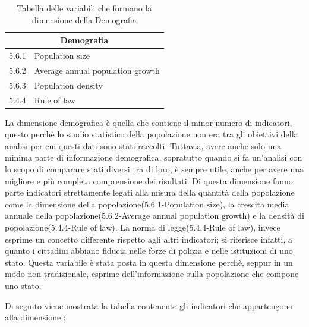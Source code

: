 \documentclass[a4paper,12pt, openright]{report}
\begin{document}
\begin{table}[h!]
    \centering
    \begin{tabular}{ |l|l| }
        \hline
        \multicolumn{2}{|c|}{\textbf{Demografia}} \\
        \hline
        5.6.1 & Population size \\
        \hline
        5.6.2 & Average annual population growth \\
        \hline
        5.6.3 & Population density \\
        \hline
        5.4.4 & Rule of law \\
        \hline
      \end{tabular}
      \caption{Tabella delle variabili che formano la dimensione della Demografia}
    \label{table:1}
\end{table}

La dimensione demografica è quella che contiene il minor numero di indicatori, questo perchè lo studio statistico della popolazione non era tra gli obiettivi 
della analisi per cui questi dati sono stati raccolti. Tuttavia, avere anche solo una minima parte di informazione demografica, sopratutto quando si fa un'analisi 
con lo scopo di comparare stati diversi tra di loro, è sempre utile, anche per avere una migliore e più completa comprensione dei risultati. Di questa dimensione
fanno parte indicatori strettamente legati alla misura della quantità della popolazione come la dimensione della popolazione(5.6.1-Population size), la 
crescita media annuale della popolazione(5.6.2-Average annual population growth) e la densità di popolazione(5.4.4-Rule of law). La norma di 
legge(5.4.4-Rule of law), invece esprime un concetto differente rispetto agli altri indicatori; si riferisce infatti, a quanto i cittadini abbiano fiducia 
nelle forze di polizia e nelle istituzioni di uno stato. Questa variabile è stata posta in questa dimensione perchè, seppur in un modo non tradizionale, esprime
dell'informazione sulla popolazione che compone uno stato. \\

\newpage 

Di seguito viene mostrata la tabella contenente gli indicatori che appartengono alla dimensione ; \\
\end{document}
